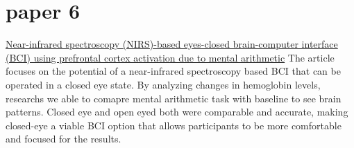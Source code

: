 \documentclass[12pt]{article}
\begin{document}
\section{paper 6}
\href{https://www.nature.com/articles/srep36203}{Near-infrared spectroscopy (NIRS)-based eyes-closed brain-computer interface (BCI) using prefrontal cortex activation due to mental arithmetic}
The article focuses on the potential of a near-infrared spectroscopy based BCI that can be operated in a closed eye state. By analyzing changes in hemoglobin levels, researchs we able to comapre mental arithmetic task with baseline to see brain patterns. Closed eye and open eyed both were comparable and accurate, making closed-eye a viable BCI option that allows participants to be more comfortable and focused for the results. 
\end{document}
